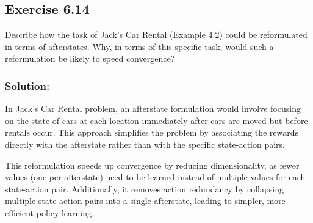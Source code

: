\subsection*{Exercise 6.14}
Describe how the task of Jack's Car Rental (Example 4.2) could be
reformulated in terms of afterstates. Why, in terms of this specific task, would such a
reformulation be likely to speed convergence?

\subsubsection*{Solution:}

In Jack's Car Rental problem, an afterstate formulation would involve focusing on the state of cars
at each location immediately after cars are moved but before rentals occur. This approach simplifies
the problem by associating the rewards directly with the afterstate rather than with the specific state-action pairs.

This reformulation speeds up convergence by reducing dimensionality, as fewer values (one per afterstate) need to be 
learned instead of multiple values for each state-action pair. Additionally, it removes action redundancy by collapsing 
multiple state-action pairs into a single afterstate, leading to simpler, more efficient policy learning.
